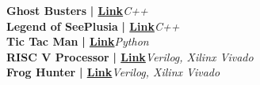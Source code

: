 \documentclass[a4paper]{article}
\begin{document}
\vspace*{3mm}
      {\textbf{Ghost Busters}}\textbf{ | \href{https://github.com/rohanraaj2/Ghost-Busters}{Link}}\hfill{\sl C++}\\

\vspace*{3mm}
      {\textbf{Legend of SeePlusia}}\textbf{ | \href{https://github.com/rohanraaj2/Legend-of-SeePlusia}{Link}}\hfill{\sl C++}\\

\vspace*{3mm}
      {\textbf{Tic Tac Man}}\textbf{ | \href{https://github.com/rohanraaj2/Tic-Tac-Man}{Link}}\hfill{\sl Python}\\

\vspace*{3mm}
      {\textbf{RISC V Processor}}\textbf{ | \href{https://github.com/rohanraaj2/RISC-V-Processor}{Link}}\hfill{\sl Verilog, Xilinx Vivado}\\

\vspace*{3mm}
      {\textbf{Frog Hunter}}\textbf{ | \href{https://github.com/rohanraaj2/Frog-Hunter}{Link}}\hfill{\sl Verilog, Xilinx Vivado}\\

\vspace*{3mm}
\end{document}

